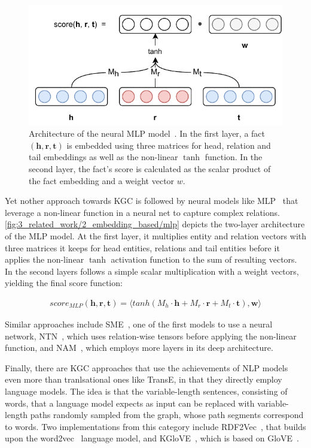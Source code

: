 \begin{figure}[t]
    \centering
    \includegraphics{3_related_work/2_embedding_based/mlp}
    \caption{Architecture of the neural MLP model~\cite{Dong2014KnowledgeVA}. In the first layer, a fact $(\textbf{h}, \textbf{r}, \textbf{t})$ is embedded using three matrices for head, relation and tail embeddings as well as the non-linear $\tanh$ function. In the second layer, the fact's score is calculated as the scalar product of the fact embedding and a weight vector $w$.}
    \label{fig:3_related_work/2_embedding_based/mlp}
\end{figure}

Yet nother approach towards KGC is followed by neural models like MLP~\cite{Dong2014KnowledgeVA} that leverage a non-linear function in a neural net to capture complex relations. \autoref{fig:3_related_work/2_embedding_based/mlp} depicts the two-layer architecture of the MLP model. At the first layer, it multiplies entity and relation vectors with three matrices it keeps for head entities, relations and tail entities before it applies the non-linear $\tanh$ activation function to the sum of resulting vectors. In the second layers follows a simple scalar multiplication with a weight vectors, yielding the final score function:

\begin{align}
    score_{MLP}(\textbf{h}, \textbf{r}, \textbf{t}) = \langle tanh(M_h \cdot \textbf{h} + M_r \cdot \textbf{r} + M_t \cdot \textbf{t}), \textbf{w} \rangle
    \label{eq:3_related_work/2_embedding_based/mlp}
\end{align}

Similar approaches include SME~\cite{Glorot2013ASM}, one of the first models to use a neural network, NTN~\cite{Socher2013ReasoningWN}, which uses relation-wise tensors before applying the non-linear function, and NAM~\cite{LIU2016ProbabilisticRV}, which employs more layers in its deep architecture.

Finally, there are KGC approaches that use the achievements of NLP models even more than tranlsational ones like TransE, in that they directly employ language models. The idea is that the variable-length sentences, consisting of words, that a language model expects as input can be replaced with variable-length paths randomly sampled from the graph, whose path segments correspond to words. Two implementations from this category include RDF2Vec~\cite{Ristoski2016RDF2VecRG}, that builds upon the word2vec~\cite{Mikolov2013EfficientEO} language model, and KGloVE~\cite{Cochez2017GlobalRV}, which is based on GloVE~\cite{Pennington2014GloveGV}.
